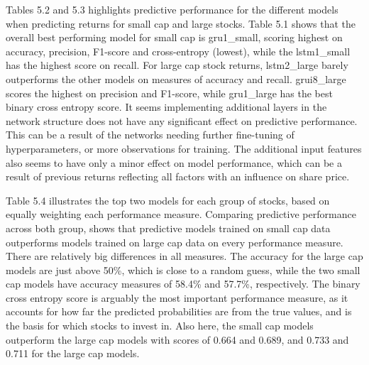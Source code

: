\indent\newline
Tables 5.2 and 5.3 highlights predictive performance for the different models when predicting returns for small cap and large stocks. Table 5.1 shows that the overall best performing model for small cap is gru1\_small, scoring highest on accuracy, precision, F1-score and cross-entropy (lowest), while the lstm1\_small has the highest score on recall. For large cap stock returns, lstm2\_large barely outperforms the other models on measures of accuracy and recall. grui8\_large scores the highest on precision and F1-score, while gru1\_large has the best binary cross entropy score. It seems implementing additional layers in the network structure does not have any significant effect on predictive performance. This can be a result of the networks needing further fine-tuning of hyperparameters, or more observations for training. The additional input features also seems to have only a minor effect on model performance, which can be a result of previous returns reflecting all factors with an influence on share price.

\indent\newline
\begin{table}[ht]
\centering
{}
\caption{Comparison of top performing models}
\end{table}

\indent\newline
Table 5.4 illustrates the top two models for each group of stocks, based on equally weighting each performance measure. Comparing predictive performance across both group, shows that predictive models trained on small cap data outperforms models trained on large cap data on every performance measure. There are relatively big differences in all measures. The accuracy for the large cap models are just above 50\%, which is close to a random guess, while the two small cap models have accuracy measures of 58.4\% and 57.7\%, respectively. The binary cross entropy score is arguably the most important performance measure, as it accounts for how far the predicted probabilities are from the true values, and is the basis for which stocks to invest in. Also here, the small cap models outperform the large cap models with scores of 0.664 and 0.689, and 0.733 and 0.711 for the large cap models.     

